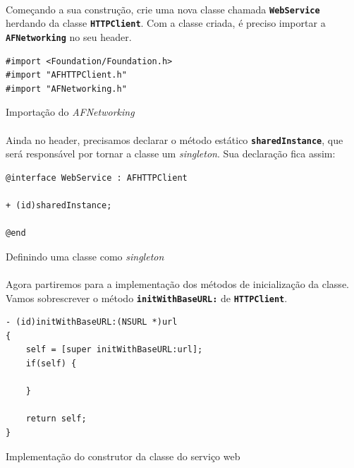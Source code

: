 \documentclass[a4paper,12pt,brazil,doubleside]{book}
\begin{document}
\begin{singlespace}
\paragraph{}Começando a sua construção, crie uma nova classe chamada \texttt{\textbf{WebService}} herdando da classe \texttt{\textbf{HTTPClient}}. Com a classe criada, é preciso importar a \texttt{\textbf{AFNetworking}} no seu header.

\begin{listing}[H]
\begin{verbatim}
#import <Foundation/Foundation.h>
#import "AFHTTPClient.h"
#import "AFNetworking.h"
\end{verbatim}
\caption{Importação do \emph{AFNetworking}}
\end{listing}

\paragraph{}Ainda no header, precisamos declarar o método estático \texttt{\textbf{sharedInstance}}, que será responsável por tornar a classe um \emph{singleton}. Sua declaração fica assim:

\begin{listing}[H]
\begin{verbatim}
@interface WebService : AFHTTPClient

+ (id)sharedInstance;

@end
\end{verbatim}
\caption{Definindo uma classe como \emph{singleton}}
\end{listing}

\paragraph{}Agora partiremos para a implementação dos métodos de inicialização da classe. Vamos sobrescrever o método \texttt{\textbf{initWithBaseURL:}} de \texttt{\textbf{HTTPClient}}.

\begin{listing}[H]
\begin{verbatim}
- (id)initWithBaseURL:(NSURL *)url
{
    self = [super initWithBaseURL:url];
    if(self) {
    
    }
    
    return self;
}
\end{verbatim}
\caption{Implementação do construtor da classe do serviço web}
\end{listing}


\end{singlespace}
\end{document}
